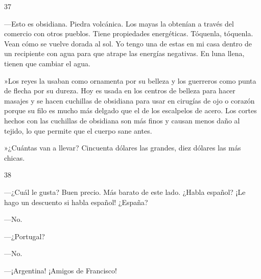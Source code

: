 \documentclass[12pt,twoside,openright,a5paper]{book}
\begin{document}
\vspace{0.5cm}

\hrulefill \hspace{0.1cm}\decofourleft\hspace{0.2cm} 37 \hspace{0.2cm}\decofourright \hspace{0.1cm}\hrulefill

\nopagebreak

\vspace{0.5cm}

\nopagebreak

---Esto es obsidiana. Piedra volcánica. Los mayas la obtenían a través
del comercio con otros pueblos. Tiene propiedades energéticas. Tóquenla,
tóquenla. Vean cómo se vuelve dorada al sol. Yo tengo una de estas en
mi casa dentro de un recipiente con agua para que atrape las energías
negativas. En luna llena, tienen que cambiar el agua.

»Los reyes la usaban como ornamenta por su belleza y los guerreros como punta
de flecha por su dureza. Hoy es usada en los centros de belleza para hacer
masajes y se hacen cuchillas de obsidiana para usar en cirugías de ojo o
corazón porque su filo es mucho más delgado que el de los escalpelos de
acero. Los cortes hechos con las cuchillas de obsidiana son más finos y
causan menos daño al tejido, lo que permite que el cuerpo sane antes.

»¿Cuántas van a llevar? Cincuenta dólares las grandes, diez dólares las más chicas.

\vspace{0.5cm}

\hrulefill \hspace{0.1cm}\decofourleft\hspace{0.2cm} 38 \hspace{0.2cm}\decofourright \hspace{0.1cm}\hrulefill

\nopagebreak

\vspace{0.5cm}

\nopagebreak

---¿Cuál le gusta? Buen precio. Más barato de este lado. ¿Habla español? ¡Le
hago un descuento si habla español! ¿España?

---No.

---¿Portugal?

---No.

---¡Argentina! ¡Amigos de Francisco!
\end{document}
